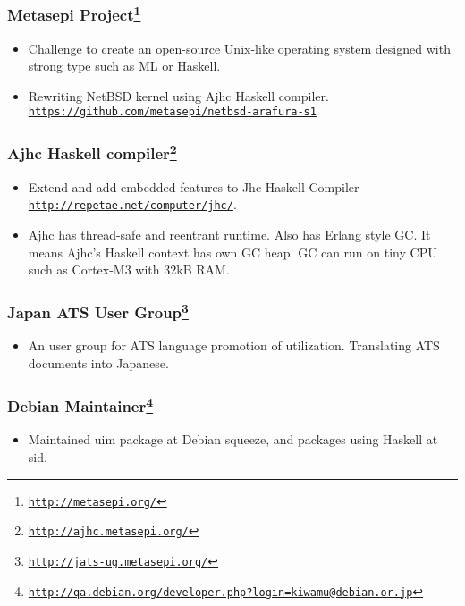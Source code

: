 \documentclass[letterpaper]{article}
\begin{document}
\subsubsection*{Metasepi Project\footnote{\href{http://metasepi.org/}{\tt http://metasepi.org/}}}
\begin{itemize}
\item Challenge to create an open-source Unix-like operating system designed with strong type such as ML or Haskell.
\item Rewriting NetBSD kernel using Ajhc Haskell compiler. \href{https://github.com/metasepi/netbsd-arafura-s1}{\tt https://github.com/metasepi/netbsd-arafura-s1}
\end{itemize}

\subsubsection*{Ajhc Haskell compiler\footnote{\href{http://ajhc.metasepi.org/}{\tt http://ajhc.metasepi.org/}}}
\begin{itemize}
\item Extend and add embedded features to Jhc Haskell Compiler \href{http://repetae.net/computer/jhc/}{\tt http://repetae.net/computer/jhc/}.
\item Ajhc has thread-safe and reentrant runtime. Also has Erlang style GC. It means Ajhc's Haskell context has own GC heap. GC can run on tiny CPU such as Cortex-M3 with 32kB RAM.
\end{itemize}

\subsubsection*{Japan ATS User Group\footnote{\href{http://jats-ug.metasepi.org/}{\tt http://jats-ug.metasepi.org/}}}
\begin{itemize}
\item An user group for ATS language promotion of utilization. Translating ATS documents into Japanese.
\end{itemize}

\subsubsection*{Debian Maintainer\footnote{\href{http://qa.debian.org/developer.php?login=kiwamu@debian.or.jp}{\tt http://qa.debian.org/developer.php?login=kiwamu@debian.or.jp}}}
\begin{itemize}
\item Maintained uim package at Debian squeeze, and packages using Haskell at sid.
\end{itemize}
\end{document}

